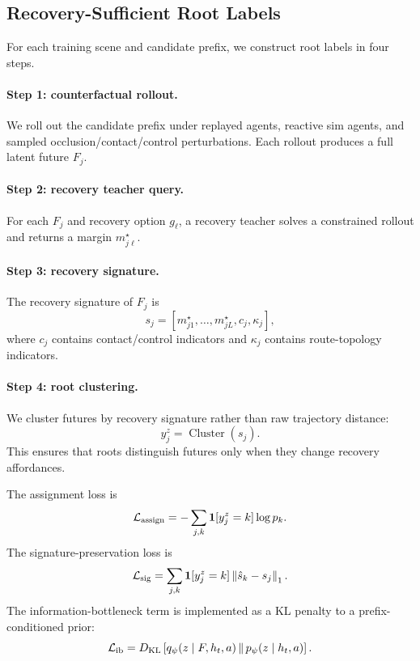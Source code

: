 \documentclass[conference]{IEEEtran}
\begin{document}
\subsection{Recovery-Sufficient Root Labels}
\label{app:root_labels}

For each training scene and candidate prefix, we construct root labels in four steps.

\paragraph{Step 1: counterfactual rollout.}
We roll out the candidate prefix under replayed agents, reactive sim agents, and sampled occlusion/contact/control perturbations.  Each rollout produces a full latent future $F_j$.

\paragraph{Step 2: recovery teacher query.}
For each $F_j$ and recovery option $g_\ell$, a recovery teacher solves a constrained rollout and returns a margin $m_{j\ell}^{\star}$.

\paragraph{Step 3: recovery signature.}
The recovery signature of $F_j$ is
\begin{equation}
    s_j =
    [
        m_{j1}^{\star},
        \ldots,
        m_{jL}^{\star},
        c_j,
        \kappa_j
    ],
\end{equation}
where $c_j$ contains contact/control indicators and $\kappa_j$ contains route-topology indicators.

\paragraph{Step 4: root clustering.}
We cluster futures by recovery signature rather than raw trajectory distance:
\begin{equation}
    y_j^z
    =
    \operatorname{Cluster}(s_j).
\end{equation}
This ensures that roots distinguish futures only when they change recovery affordances.

The assignment loss is
\begin{equation}
    \mathcal{L}_{\rm assign}
    =
    -\sum_{j,k}
    \mathbf{1}[y_j^z=k]\log p_k.
\end{equation}
The signature-preservation loss is
\begin{equation}
    \mathcal{L}_{\rm sig}
    =
    \sum_{j,k}
    \mathbf{1}[y_j^z=k]
    \left\|
        \hat s_k - s_j
    \right\|_1.
\end{equation}
The information-bottleneck term is implemented as a KL penalty to a prefix-conditioned prior:
\begin{equation}
    \mathcal{L}_{\rm ib}
    =
    D_{\rm KL}
    \left[
        q_\psi(z\mid F,h_t,a)
        \,\|\, 
        p_\psi(z\mid h_t,a)
    \right].
\end{equation}
\end{document}
